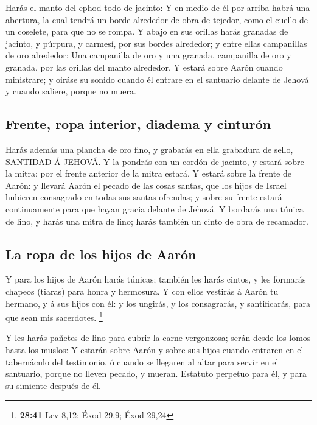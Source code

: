  Harás el manto del ephod todo de jacinto:  Y
en medio de él por arriba habrá una abertura, la cual tendrá un borde
alrededor de obra de tejedor, como el cuello de un coselete, para que no
se rompa.  Y abajo en sus orillas harás granadas de
jacinto, y púrpura, y carmesí, por sus bordes alrededor; y entre ellas
campanillas de oro alrededor:  Una campanilla de oro y una
granada, campanilla de oro y granada, por las orillas del manto
alrededor.  Y estará sobre Aarón cuando ministrare; y
oiráse su sonido cuando él entrare en el santuario delante de Jehová y
cuando saliere, porque no muera.

\hypertarget{frente-ropa-interior-diadema-y-cinturuxf3n}{%
\subsection{Frente, ropa interior, diadema y
cinturón}\label{frente-ropa-interior-diadema-y-cinturuxf3n}}

 Harás además una plancha de oro fino, y grabarás en ella
grabadura de sello, SANTIDAD Á JEHOVÁ.  Y la pondrás con un
cordón de jacinto, y estará sobre la mitra; por el frente anterior de la
mitra estará.  Y estará sobre la frente de Aarón: y llevará
Aarón el pecado de las cosas santas, que los hijos de Israel hubieren
consagrado en todas sus santas ofrendas; y sobre su frente estará
continuamente para que hayan gracia delante de Jehová.  Y
bordarás una túnica de lino, y harás una mitra de lino; harás también un
cinto de obra de recamador.

\hypertarget{la-ropa-de-los-hijos-de-aaruxf3n}{%
\subsection{La ropa de los hijos de
Aarón}\label{la-ropa-de-los-hijos-de-aaruxf3n}}

 Y para los hijos de Aarón harás túnicas; también les harás
cintos, y les formarás chapeos (tiaras) para honra y hermosura.
 Y con ellos vestirás á Aarón tu hermano, y á sus hijos con
él: y los ungirás, y los consagrarás, y santificarás, para que sean mis
sacerdotes. \footnote{\textbf{28:41} Lev 8,12; Éxod 29,9; Éxod 29,24}

 Y les harás pañetes de lino para cubrir la carne
vergonzosa; serán desde los lomos hasta los muslos:  Y
estarán sobre Aarón y sobre sus hijos cuando entraren en el tabernáculo
del testimonio, ó cuando se llegaren al altar para servir en el
santuario, porque no lleven pecado, y mueran. Estatuto perpetuo para él,
y para su simiente después de él.

